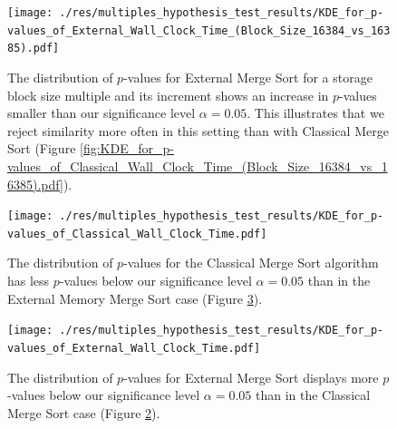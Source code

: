\documentclass[twocolumn]{article}
\begin{document}
\begin{figure}[htb]
    \begin{minipage}{0.475 \textwidth}
        \centering
        \texttt{[image: ./res/multiples\_hypothesis\_test\_results/KDE\_for\_p-values\_of\_External\_Wall\_Clock\_Time\_(Block\_Size\_16384\_vs\_16385).pdf]}
        \caption{The distribution of \( p \)-values for External Merge Sort for a storage block size multiple and its increment shows an increase in \( p \)-values smaller
            than our significance level \( \alpha = 0.05 \). This illustrates that we reject similarity more often in this setting than with Classical Merge Sort (Figure \ref{fig:KDE_for_p-values_of_Classical_Wall_Clock_Time_(Block_Size_16384_vs_16385).pdf}).}
        \label{fig:KDE_for_p-values_of_External_Wall_Clock_Time_(Block_Size_16384_vs_16385).pdf}
    \end{minipage}
\end{figure}

\begin{figure}[htb]
    \begin{minipage}{0.475 \textwidth}
        \centering
        \texttt{[image: ./res/multiples\_hypothesis\_test\_results/KDE\_for\_p-values\_of\_Classical\_Wall\_Clock\_Time.pdf]}
        \caption{The distribution of \( p \)-values for the Classical Merge Sort algorithm has less \( p \)-values below our significance level \( \alpha = 0.05 \) than in the External Memory Merge Sort case (Figure \ref{fig:KDE_for_p-values_of_External_Wall_Clock_Time.pdf}).}
        \label{fig:KDE_for_p-values_of_Classical_Wall_Clock_Time.pdf}
    \end{minipage}
\end{figure}

\begin{figure}[htb]
    \begin{minipage}{0.475 \textwidth}
        \centering
        \texttt{[image: ./res/multiples\_hypothesis\_test\_results/KDE\_for\_p-values\_of\_External\_Wall\_Clock\_Time.pdf]}
        \caption{The distribution of \( p \)-values for External Merge Sort displays more \( p \)-values below our significance level \( \alpha = 0.05 \) than in the Classical Merge Sort case (Figure \ref{fig:KDE_for_p-values_of_Classical_Wall_Clock_Time.pdf}).}
        \label{fig:KDE_for_p-values_of_External_Wall_Clock_Time.pdf}
    \end{minipage}
\end{figure}
\end{document}
